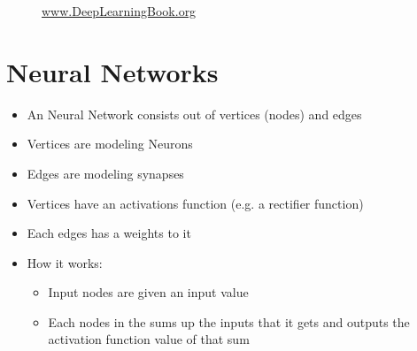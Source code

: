 \documentclass[t]{beamer}
\begin{document}
\begin{frame}
\begin{itemize}
\begin{figure}
\begin{minipage}{0.45\textwidth}
\begin{figure}[]
                \end{figure}
            \end{minipage}
            \caption{\href{http://www.deeplearningbook.org}{www.DeepLearningBook.org}}
        \end{figure}
    \end{itemize}
\end{frame}

\section{Neural Networks}

\begin{frame}
    \begin{itemize}
        \item An Neural Network consists out of vertices (nodes) and edges
        \item Vertices are modeling Neurons
        \item Edges are modeling synapses
        \item Vertices have an activations function (e.g. a rectifier function)
        \item Each edges has a weights to it
    \end{itemize}

    \begin{itemize}
        \item How it works:
        \begin{itemize}
            \item Input nodes are given an input value
            \item Each nodes in the sums up the inputs that it gets and outputs the activation function value of that sum
        \end{itemize}
    \end{itemize}
\end{frame}
\end{document}

